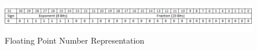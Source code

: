 \begin{figure}[!h]
\centering
\includegraphics[scale=0.65]{figures/float.PNG}
\caption{Floating Point Number Representation}
\label{fig:Float Representation}
\end{figure}